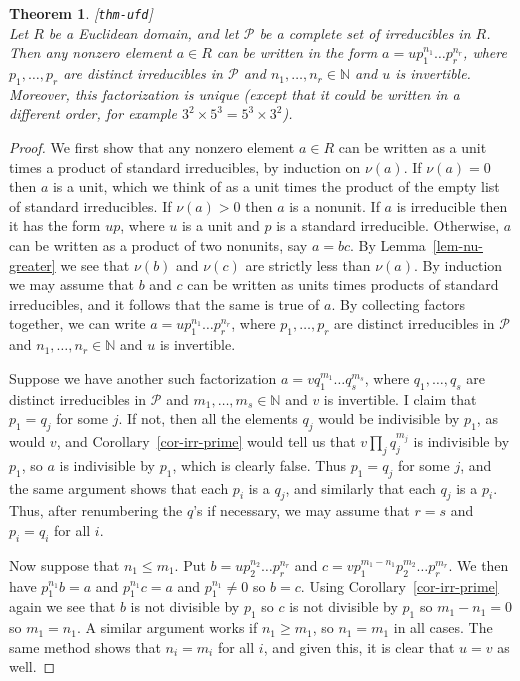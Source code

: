 \documentclass{amsart}
\newcommand{\lbl}[1]{\label{#1}\textup{[\texttt{#1}]}\ \\}
\newcommand{\lbl}{\label}
\newcommand{\N}         {{\mathbb{N}}}
\newcommand{\tm}        {\times}
\newcommand{\CP}        {{\mathcal{P}}}
\renewcommand{\:}{\colon}
\newtheorem{theorem}{Theorem}[section]
\theoremstyle{definition}
\begin{document}
\begin{theorem}\lbl{thm-ufd}
 Let $R$ be a Euclidean domain, and let $\CP$ be a complete set of
 irreducibles in $R$.  Then any nonzero element $a\in R$ can be
 written in the form $a=up_1^{n_1}\ldots p_r^{n_r}$, where
 $p_1,\ldots,p_r$ are distinct irreducibles in $\CP$ and
 $n_1,\ldots,n_r\in\N$ and $u$ is invertible.  Moreover, this
 factorization is unique (except that it could be written in a
 different order, for example $3^2\tm 5^3=5^3\tm 3^2$).
\end{theorem}
\begin{proof}
 We first show that any nonzero element $a\in R$ can be written as a
 unit times a product of standard irreducibles, by induction on
 $\nu(a)$.  If $\nu(a)=0$ then $a$ is a unit, which we think of as a
 unit times the product of the empty list of standard irreducibles.
 If $\nu(a)>0$ then $a$ is a nonunit.  If $a$ is irreducible then it
 has the form $up$, where $u$ is a unit and $p$ is a standard
 irreducible.  Otherwise, $a$ can be written as a product of two
 nonunits, say $a=bc$.  By Lemma~\ref{lem-nu-greater} we see that
 $\nu(b)$ and $\nu(c)$ are strictly less than $\nu(a)$.  By induction
 we may assume that $b$ and $c$ can be written as units times products
 of standard irreducibles, and it follows that the same is true of
 $a$.  By collecting factors together, we can write
 $a=up_1^{n_1}\ldots p_r^{n_r}$, where $p_1,\ldots,p_r$ are distinct
 irreducibles in $\CP$ and $n_1,\ldots,n_r\in\N$ and $u$ is
 invertible.  

 Suppose we have another such factorization
 $a=vq_1^{m_1}\ldots q_s^{m_s}$, where $q_1,\ldots,q_s$ are distinct
 irreducibles in $\CP$ and $m_1,\ldots,m_s\in\N$ and $v$ is
 invertible.  I claim that $p_1=q_j$ for some $j$.  If not, then all
 the elements $q_j$ would be indivisible by $p_1$, as would $v$, and
 Corollary~\ref{cor-irr-prime} would tell us that $v\prod_jq_j^{m_j}$
 is indivisible by $p_1$, so $a$ is indivisible by $p_1$, which is
 clearly false.  Thus $p_1=q_j$ for some $j$, and the same argument
 shows that each $p_i$ is a $q_j$, and similarly that each $q_j$ is a
 $p_i$.  Thus, after renumbering the $q$'s if necessary, we may assume
 that $r=s$ and $p_i=q_i$ for all $i$.

 Now suppose that $n_1\leq m_1$.  Put $b=up_2^{n_2}\ldots p_r^{n_r}$
 and $c=vp_1^{m_1-n_1}p_2^{m_2}\ldots p_r^{m_r}$.  We then have
 $p_1^{n_1}b=a$ and $p_1^{n_1}c=a$ and $p_1^{n_1}\neq 0$ so $b=c$.
 Using Corollary~\ref{cor-irr-prime} again we see that $b$ is not
 divisible by $p_1$ so $c$ is not divisible by $p_1$ so $m_1-n_1=0$ so
 $m_1=n_1$.  A similar argument works if $n_1\geq m_1$, so $n_1=m_1$
 in all cases.  The same method shows that $n_i=m_i$ for all $i$, and
 given this, it is clear that $u=v$ as well.
\end{proof}
\end{document}
